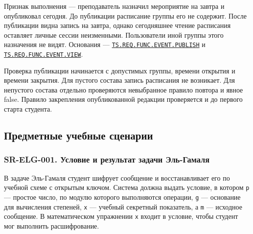 \documentclass[12pt,a4paper]{article}
\begin{document}
Признак выполнения --- преподаватель назначил мероприятие на завтра и опубликовал сегодня. До публикации расписание группы его не содержит. После публикации видна запись на завтра, однако сегодняшнее чтение расписания оставляет личные сессии неизменными. Пользователи иной группы этого назначения не видят. Основания --- {\href{../02\_Техническое\_задание/Техническое\_задание.pdf\#ts-req-func-event-publish}{\texttt{TS.\allowbreak{}REQ.\allowbreak{}FUNC.\allowbreak{}EVENT.\allowbreak{}PUBLISH}}} и {\href{../02\_Техническое\_задание/Техническое\_задание.pdf\#ts-req-func-event-view}{\texttt{TS.\allowbreak{}REQ.\allowbreak{}FUNC.\allowbreak{}EVENT.\allowbreak{}VIEW}}}.

Проверка публикации начинается с допустимых группы, времени открытия и времени закрытия. Для пустого состава запись расписания не возникает. Для непустого состава отдельно проверяются невыбранное правило повтора и явное false. Правило закрепления опубликованной редакции проверяется и до первого старта студента.

\subsection{Предметные учебные сценарии}\label{ux43fux440ux435ux434ux43cux435ux442ux43dux44bux435-ux443ux447ux435ux431ux43dux44bux435-ux441ux446ux435ux43dux430ux440ux438ux438}

\hypertarget{предметные-учебные-сценарии}{}

\subsubsection{SR-ELG-001. Условие и результат задачи Эль-Гамаля}\label{sr-elg-001-ux443ux441ux43bux43eux432ux438ux435-ux438-ux440ux435ux437ux443ux43bux44cux442ux430ux442-ux437ux430ux434ux430ux447ux438-ux44dux43bux44c-ux433ux430ux43cux430ux43bux44f}

\hypertarget{sr-elg-001-условие-и-результат-задачи-эль-гамаля}{}

\hypertarget{sr-elg-001}{}

В задаче Эль-Гамаля студент шифрует сообщение и восстанавливает его по учебной схеме с открытым ключом. Система должна выдать условие, в котором \texttt{p} --- простое число, по модулю которого выполняются операции, \texttt{g} --- основание для вычисления степеней, \texttt{x} --- учебный секретный показатель, а \texttt{m} --- исходное сообщение. В математическом упражнении \texttt{x} входит в условие, чтобы студент мог выполнить расшифрование.
\end{document}
